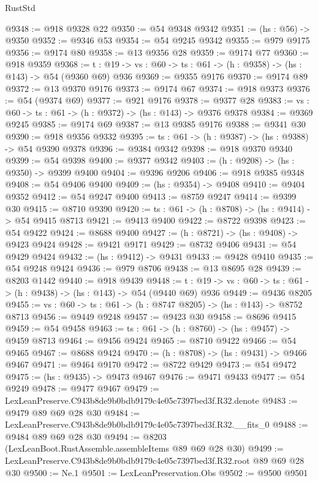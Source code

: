\begin{lexlean}{RustStd}
\begin{coremodule}
@9348 := @918 @9328 @22
@9350 := @54 @9348 @9342
@9351 := (hs : @56) -> @9350
@9352 := @9346 @53
@9354 := @54 @9245 @9342
@9355 := @979 @9175
@9356 := @9174 @80
@9358 := @13 @9356 @28
@9359 := @9174 @77
@9360 := @918 @9359
@9368 := {t : @19} -> {vs : @60} -> {ts : @61} -> (h : @9358) -> (hs : @143) -> @54 (@9360 @69) @936
@9369 := @9355 @9176
@9370 := @9174 @89
@9372 := @13 @9370 @9176
@9373 := @9174 @67
@9374 := @918 @9373
@9376 := @54 (@9374 @69)
@9377 := @921 @9176
@9378 := @9377 @28
@9383 := {vs : @60} -> {ts : @61} -> (h : @9372) -> (hs : @143) -> @9376 @9378
@9384 := @9369 @9245
@9385 := @9174 @69
@9387 := @13 @9385 @9176
@9388 := @9341 @30
@9390 := @918 @9356 @9332
@9395 := {ts : @61} -> (h : @9387) -> (hs : @9388) -> @54 @9390 @9378
@9396 := @9384 @9342
@9398 := @918 @9370 @9340
@9399 := @54 @9398
@9400 := @9377 @9342
@9403 := (h : @9208) -> (hs : @9350) -> @9399 @9400
@9404 := @9396 @9206
@9406 := @918 @9385 @9348
@9408 := @54 @9406 @9400
@9409 := (hs : @9354) -> @9408
@9410 := @9404 @9352
@9412 := @54 @9247 @9400
@9413 := @8759 @9247
@9414 := @9399 @30
@9415 := @8710 @9390
@9420 := {ts : @61} -> (h : @8708) -> (hs : @9414) -> @54 @9415 @8713
@9421 := @9413 @9400
@9422 := @8722 @9398
@9423 := @54 @9422
@9424 := @8688 @9400
@9427 := (h : @8721) -> (hs : @9408) -> @9423 @9424
@9428 := @9421 @9171
@9429 := @8732 @9406
@9431 := @54 @9429 @9424
@9432 := (hs : @9412) -> @9431
@9433 := @9428 @9410
@9435 := @54 @9248 @9424
@9436 := @979 @8706
@9438 := @13 @8695 @28
@9439 := @8203 @1442
@9440 := @918 @9439
@9448 := {t : @19} -> {vs : @60} -> {ts : @61} -> (h : @9438) -> (hs : @143) -> @54 (@9440 @69) @936
@9449 := @9436 @8205
@9455 := {vs : @60} -> {ts : @61} -> (h : @8747 @8205) -> (hs : @143) -> @8752 @8713
@9456 := @9449 @9248
@9457 := @9423 @30
@9458 := @8696 @9415
@9459 := @54 @9458
@9463 := {ts : @61} -> (h : @8760) -> (hs : @9457) -> @9459 @8713
@9464 := @9456 @9424
@9465 := @8710 @9422
@9466 := @54 @9465
@9467 := @8688 @9424
@9470 := (h : @8708) -> (hs : @9431) -> @9466 @9467
@9471 := @9464 @9170
@9472 := @8722 @9429
@9473 := @54 @9472
@9475 := (hs : @9435) -> @9473 @9467
@9476 := @9471 @9433
@9477 := @54 @9249
@9478 := @9477 @9467
@9479 := LexLeanPreserve.C943b8de9b0bdb9179c4e05c7397bed3f.R32.denote
@9483 := @9479 @89 @69 @28 @30
@9484 := LexLeanPreserve.C943b8de9b0bdb9179c4e05c7397bed3f.R32.__fits_0
@9488 := @9484 @89 @69 @28 @30
@9494 := @8203 (LexLeanBoot.RustAssemble.assembleItems @89 @69 @28 @30)
@9499 := LexLeanPreserve.C943b8de9b0bdb9179c4e05c7397bed3f.R32.root @89 @69 @28 @30
@9500 := Ne.{1}
@9501 := LexLeanPreservation.Obs
@9502 := @9500 @9501

\end{coremodule}
\end{lexlean}
